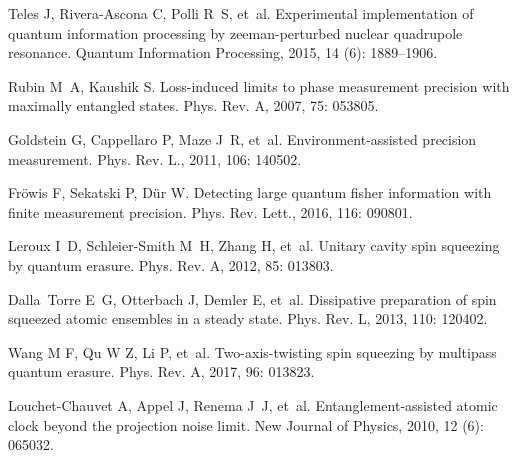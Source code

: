 \begin{thebibliography}{113}
	Teles J, Rivera-Ascona C, Polli R~S, et~al.
	\newblock Experimental implementation of quantum information processing by
	zeeman-perturbed nuclear quadrupole resonance\allowbreak[J].
	\newblock Quantum Information Processing, 2015, 14 (6): 1889--1906.
	
	Rubin M~A, Kaushik S.
	\newblock Loss-induced limits to phase measurement precision with maximally
	entangled states\allowbreak[J].
	\newblock Phys. Rev. A, 2007, 75: 053805.
	
	Goldstein G, Cappellaro P, Maze J~R, et~al.
	\newblock Environment-assisted precision measurement\allowbreak[J].
	\newblock Phys. Rev. L., 2011, 106: 140502.
	
	Fr\"owis F, Sekatski P, D\"ur W.
	\newblock Detecting large quantum fisher information with finite measurement
	precision\allowbreak[J].
	\newblock Phys. Rev. Lett., 2016, 116: 090801.
	
	Leroux I~D, Schleier-Smith M~H, Zhang H, et~al.
	\newblock Unitary cavity spin squeezing by quantum erasure\allowbreak[J].
	\newblock Phys. Rev. A, 2012, 85: 013803.
	
	Dalla~Torre E~G, Otterbach J, Demler E, et~al.
	\newblock Dissipative preparation of spin squeezed atomic ensembles in a steady
	state\allowbreak[J].
	\newblock Phys. Rev. L, 2013, 110: 120402.
	
	Wang M F, Qu W Z, Li P, et~al.
	\newblock Two-axis-twisting spin squeezing by multipass quantum
	erasure\allowbreak[J].
	\newblock Phys. Rev. A, 2017, 96: 013823.
	
	Louchet-Chauvet A, Appel J, Renema J~J, et~al.
	\newblock Entanglement-assisted atomic clock beyond the projection noise
	limit\allowbreak[J].
	\newblock New Journal of Physics, 2010, 12 (6): 065032.
	

\end{thebibliography}
